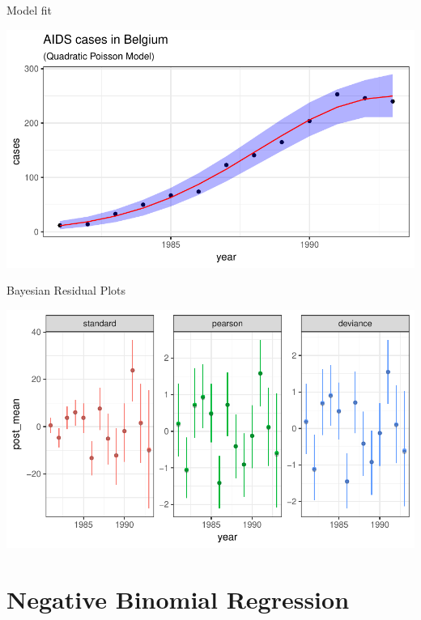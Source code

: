\documentclass[11pt,ignorenonframetext,]{beamer}
\begin{document}
\begin{frame}{Model fit}

\includegraphics{Lec3_files/figure-beamer/unnamed-chunk-26-1.pdf}

\end{frame}

\begin{frame}{Bayesian Residual Plots}

\includegraphics[width=\textwidth]{Lec3_files/figure-beamer/unnamed-chunk-27-1}

\end{frame}

\section{Negative Binomial
Regression}\label{negative-binomial-regression}
\end{document}
